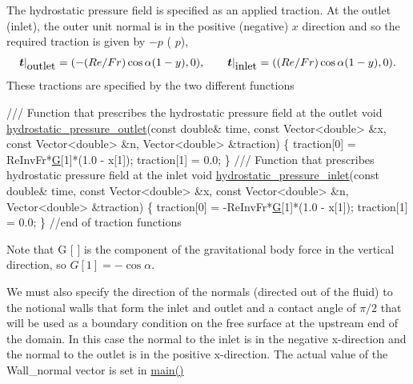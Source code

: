 The hydrostatic pressure field is specified as an applied traction. At the outlet (inlet), the outer unit normal is in the positive (negative) $x$ direction and so the required traction is given by $-p$ ( $p$), \[ \mbox{\boldmath$t$}|_{\mbox{outlet}} = (- (Re/Fr)\cos\alpha (1 - y), 0), \qquad \mbox{\boldmath$t$}|_{\mbox{inlet}} = ((Re/Fr)\cos\alpha (1 - y), 0).\] These tractions are specified by the two different functions 
\begin{DoxyCodeInclude}
 \textcolor{comment}{/// Function that prescribes the hydrostatic pressure field at the outlet}
 \textcolor{keywordtype}{void} \hyperlink{namespaceGlobal__Physical__Variables_ab577639e7c51979d3db7565c08c69c70}{hydrostatic\_pressure\_outlet}(\textcolor{keyword}{const} \textcolor{keywordtype}{double}& time, \textcolor{keyword}{const} Vector<double> &x, 
                                  \textcolor{keyword}{const} Vector<double> &n, 
                                  Vector<double> &traction)
 \{
  traction[0] = ReInvFr*\hyperlink{namespaceGlobal__Physical__Variables_aa868968dead376240a69f9152bd599b9}{G}[1]*(1.0 - x[1]);
  traction[1] = 0.0;
 \}
\textcolor{comment}{}
\textcolor{comment}{ /// Function that prescribes hydrostatic pressure field at the inlet}
\textcolor{comment}{} \textcolor{keywordtype}{void} \hyperlink{namespaceGlobal__Physical__Variables_af1f48eb04a3c7f97b1efacea533acdbc}{hydrostatic\_pressure\_inlet}(\textcolor{keyword}{const} \textcolor{keywordtype}{double}& time, \textcolor{keyword}{const} Vector<double> &x, 
                                 \textcolor{keyword}{const} Vector<double> &n,
                                 Vector<double> &traction)
 \{
  traction[0] = -ReInvFr*\hyperlink{namespaceGlobal__Physical__Variables_aa868968dead376240a69f9152bd599b9}{G}[1]*(1.0 - x[1]);
  traction[1] = 0.0;
 \}
 \textcolor{comment}{//end of traction functions}

\end{DoxyCodeInclude}
 Note that {\ttfamily G} \mbox{[} {} \mbox{]} is the component of the gravitational body force in the vertical direction, so $ G[1] = - \cos\alpha$.

We must also specify the direction of the normals (directed out of the fluid) to the notional walls that form the inlet and outlet and a contact angle of $ \pi /2 $ that will be used as a boundary condition on the free surface at the upstream end of the domain. In this case the normal to the inlet is in the negative x-\/direction and the normal to the outlet is in the positive x-\/direction. The actual value of the {\ttfamily Wall\+\_\+normal} vector is set in {\ttfamily \hyperlink{inclined__plane_8cc_a3c04138a5bfe5d72780bb7e82a18e627}{main()}} 

